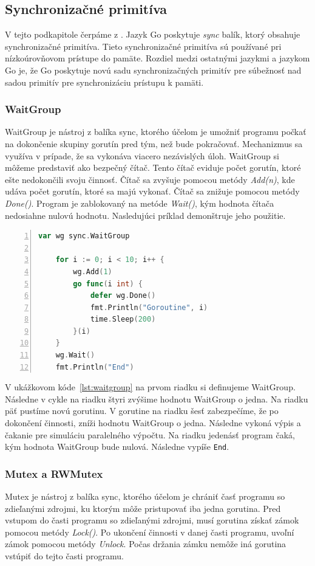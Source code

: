 \documentclass[
  biblatex,
  seconds=true,
  language=slovak,
  figures=false,
  urldate=iso,
  glossaries,
  index
]{kidiplom}
\begin{document}
\subsection{Synchronizačné primitíva}
V tejto podkapitole čerpáme z \cite{sync}.
Jazyk Go poskytuje \emph{sync} balík, ktorý obsahuje synchronizačné primitíva. Tieto synchronizačné primitíva sú používané pri nízkoúrovňovom
prístupe do pamäte. Rozdiel medzi ostatnými jazykmi a jazykom Go je, že Go poskytuje novú sadu synchronizačných primitív pre súbežnosť nad sadou primitív pre synchronizáciu prístupu k pamäti.

\subsubsection{WaitGroup}
WaitGroup je nástroj z balíka sync, ktorého účelom je umožniť programu počkať na dokončenie skupiny gorutín pred tým, než bude pokračovať.
Mechanizmus sa využíva v prípade, že sa vykonáva viacero nezávislých úloh.
WaitGroup si môžeme predstaviť ako bezpečný čítač. Tento čítač eviduje počet gorutín, ktoré ešte nedokončili svoju činnosť.
Čítač sa zvyšuje pomocou metódy \emph{Add(n)}, kde  udáva počet gorutín, ktoré sa majú vykonať.
Čítač sa znižuje pomocou metódy \emph{Done()}.
Program je zablokovaný na metóde \emph{Wait()}, kým hodnota čítača nedosiahne nulovú hodnotu. Nasledujúci príklad demonštruje jeho použitie.
\newpage
\begin{lstlisting}[language=Go, numbers=left, caption={Použitie WaitGroup}, captionpos=b, label={lst:waitgroup}]
    var wg sync.WaitGroup

	for i := 0; i < 10; i++ {
		wg.Add(1)
		go func(i int) {
			defer wg.Done()
			fmt.Println("Goroutine", i)
			time.Sleep(200)
		}(i)
	}
	wg.Wait()
	fmt.Println("End")
\end{lstlisting}
V ukážkovom kóde~\ref{lst:waitgroup} na prvom riadku si definujeme WaitGroup. Následne v cykle na riadku štyri zvýšime hodnotu WaitGroup o jedna. Na riadku päť pustíme novú gorutinu.
V gorutine na riadku šesť zabezpečíme, že po dokončení činnosti, zníži hodnotu WaitGroup o jedna.
Následne vykoná výpis a čakanie pre simuláciu paralelného výpočtu.
Na riadku jedenásť program čaká, kým hodnota WaitGroup bude nulová. Následne vypíše \texttt{End}.

\subsubsection{Mutex a RWMutex}
Mutex je nástroj z balíka sync, ktorého účelom je chrániť časť programu so zdieľanými zdrojmi, ku ktorým môže pristupovať iba jedna gorutina.
Pred vstupom do časti programu so zdieľanými zdrojmi, musí gorutina získať zámok pomocou metódy \emph{Lock()}. Po ukončení činnosti
v danej časti programu, uvoľní zámok pomocou metódy \emph{Unlock}. Počas držania zámku nemôže iná gorutina vstúpiť do tejto časti programu.
\end{document}
